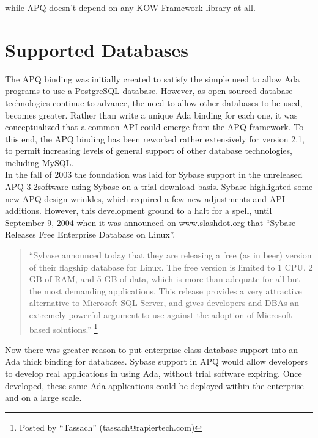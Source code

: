 \documentclass[english,letterpaper]{book}
\newcommand\apqversion{3.2}
\begin{document}
while APQ doesn't depend on any KOW Framework library at all.

\section{Supported Databases}

The APQ binding was initially created to satisfy the simple need to
allow Ada programs to use a PostgreSQL database. However, as open
sourced database technologies continue to advance, the need to allow
other databases to be used, becomes greater. Rather than write a unique
Ada binding for each one, it was conceptualized that a common API
could emerge from the APQ framework. To this end, the APQ binding
has been reworked rather extensively for version 2.1, to permit increasing
levels of general support of other database technologies, including
MySQL.\\

In the fall of 2003 the foundation was laid for Sybase support in
the unreleased APQ \apqversion software using Sybase on a trial download basis.
Sybase highlighted some new APQ design  wrinkles, which required a
few new adjustments and API additions. However, this development ground
to a halt for a spell, until September 9, 2004 when it was announced
on www.slashdot.org that ``Sybase Releases Free Enterprise Database
on Linux''.\\

\begin{quote}
``Sybase announced today that they are releasing a free (as in
beer) version of their flagship database for Linux. The free version
is limited to 1 CPU, 2 GB of RAM, and 5 GB of data, which is more
than adequate for all but the most demanding applications. This release
provides a very attractive alternative to Microsoft SQL Server, and
gives developers and DBAs an extremely powerful argument to use against
the adoption of Microsoft-based solutions.''%
\footnote{Posted by ``Tassach'' (tassach@rapiertech.com)}
\end{quote}

Now there was greater reason to put enterprise class database support
into an Ada thick binding for databases. Sybase support in APQ would
allow developers to develop real applications in using Ada, without
trial software expiring. Once developed, these same Ada applications
could be deployed within the enterprise and on a large scale.\\
\end{document}
